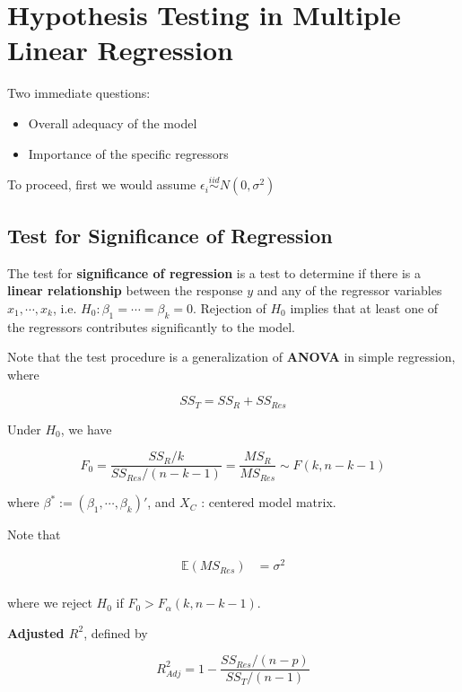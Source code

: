 \documentclass[12pt]{article}
\begin{document}
\section{Hypothesis Testing in Multiple Linear Regression}

Two immediate questions:

\begin{itemize}
	\item Overall adequacy of the model
	\item Importance of the specific regressors
\end{itemize}

To proceed, first we would assume $\epsilon_i \overset{iid}{\sim} N\left(0, \sigma^2 \right)$

\subsection{Test for Significance of Regression}

The test for \textbf{significance of regression} is a test to determine if there is a \textbf{linear relationship} between the response $y$ and any of the regressor variables $x_1, \cdots, x_k$, i.e. $H_0 : \beta_1 = \cdots = \beta_k = 0$. Rejection of $H_0$ implies that at least one of the regressors contributes significantly to the model.

Note that the test procedure is a generalization of \textbf{ANOVA} in simple regression, where

$$
SS_T = SS_R + SS_{Res}
$$

Under $H_0$, we have 

$$
F_0 = \frac{SS_R / k}{SS_{Res}/(n-k-1)} = \frac{MS_R}{MS_{Res}} \sim F(k, n-k-1) 
$$

where $\beta^{\ast} := (\beta_1, \cdots, \beta_k)'$, and $X_C$ : centered model matrix.

Note that 

$$
\begin{aligned}
\mathbb{E} (MS_{Res}) &= \sigma^2 \\[8pt]
\end{aligned}
$$

where we reject $H_0$ if $F_0 > F_\alpha (k, n-k-1)$. 




\textbf{Adjusted $R^2$}, defined by

$$
R_{Adj}^2 = 1 - \frac{SS_{Res}/(n-p)}{SS_T/(n-1)}
$$
\end{document}
